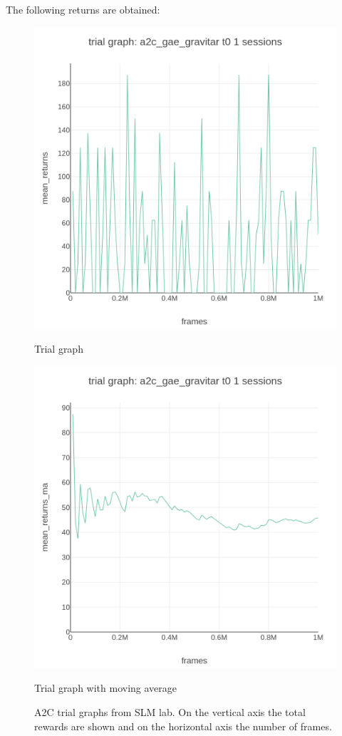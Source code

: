 \documentclass[12pt,a4paper]{report}
\begin{document}
\begin{enumerate}
		The following returns are obtained:
		
		\begin{figure}[ht!]
			\begin{minipage}[c]{0.5\linewidth}
				\centering
				\includegraphics[height=0.3\textheight, width=0.9\linewidth]{a2c_gae_gravitar_t0_trial_graph_mean_returns_vs_frames.png}
				\caption{Trial graph}
			\end{minipage}\hfill
			\begin{minipage}[c]{0.5\linewidth}	
				\centering
				\includegraphics[height=0.3\textheight, width=0.9\linewidth]{a2c_gae_gravitar_t0_trial_graph_mean_returns_ma_vs_frames.png}
				\caption{Trial graph with moving average}
			\end{minipage}
			\caption{A2C trial graphs from SLM lab. On the vertical axis the total rewards are shown and on the horizontal axis the number of frames.}
			\end{figure}
		

\end{enumerate}
\end{document}
